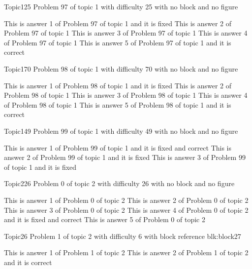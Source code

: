 \documentclass[master]{exam}
\begin{document}
\begin{problem}{Topic1}{25}
	Problem 97 of topic 1 with difficulty 25 with no block and no figure
	\begin{answers}
		\answer[fixed] This is answer 1 of Problem 97 of topic 1 and it is fixed
		\answer This is answer 2 of Problem 97 of topic 1 
		\answer This is answer 3 of Problem 97 of topic 1 
		\answer This is answer 4 of Problem 97 of topic 1 
		\answer[correct] This is answer 5 of Problem 97 of topic 1 and it is correct
	\end{answers}
\end{problem}

\begin{problem}{Topic1}{70}
	Problem 98 of topic 1 with difficulty 70 with no block and no figure
	\begin{answers}
		\answer[fixed] This is answer 1 of Problem 98 of topic 1 and it is fixed
		\answer This is answer 2 of Problem 98 of topic 1 
		\answer This is answer 3 of Problem 98 of topic 1 
		\answer This is answer 4 of Problem 98 of topic 1 
		\answer[correct] This is answer 5 of Problem 98 of topic 1 and it is correct
	\end{answers}
\end{problem}

\begin{problem}{Topic1}{49}
	Problem 99 of topic 1 with difficulty 49 with no block and no figure
	\begin{answers}
		 This is answer 1 of Problem 99 of topic 1 and it is fixed and correct
		\answer[fixed] This is answer 2 of Problem 99 of topic 1 and it is fixed
		\answer[fixed] This is answer 3 of Problem 99 of topic 1 and it is fixed
	\end{answers}
\end{problem}

\begin{problem}{Topic2}{26}
	Problem 0 of topic 2 with difficulty 26 with no block and no figure
	\begin{answers}
		\answer This is answer 1 of Problem 0 of topic 2 
		\answer This is answer 2 of Problem 0 of topic 2 
		\answer This is answer 3 of Problem 0 of topic 2 
		 This is answer 4 of Problem 0 of topic 2 and it is fixed and correct
		\answer This is answer 5 of Problem 0 of topic 2 
	\end{answers}
\end{problem}

\begin{problem}[requires=blk:block27]{Topic2}{6}
	Problem 1 of topic 2 with difficulty 6 with block reference blk:block27
	\begin{answers}
		\answer This is answer 1 of Problem 1 of topic 2 
		\answer[correct] This is answer 2 of Problem 1 of topic 2 and it is correct
	\end{answers}
\end{problem}
\end{document}
